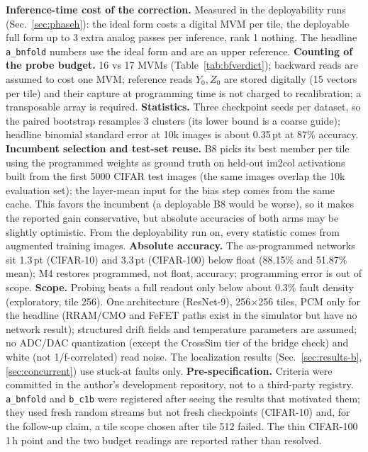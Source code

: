 \documentclass[journal]{IEEEtran}
\newcommand{\mfour}{\textsc{M4}}
\newcommand{\bviii}{\textsc{B8}}
\newcommand{\pt}{\,pt}
\begin{document}
\textbf{Inference-time cost of the correction.} Measured in the deployability runs (Sec.~\ref{sec:phaseh}): the ideal form costs a digital MVM per tile, the deployable full form up to 3 extra analog passes per inference, rank 1 nothing. The headline \texttt{a\_bnfold} numbers use the ideal form and are an upper reference.
\textbf{Counting of the probe budget.} 16 vs 17 MVMs (Table~\ref{tab:bfverdict}); backward reads are assumed to cost one MVM; reference reads $Y_0,Z_0$ are stored digitally (15 vectors per tile) and their capture at programming time is not charged to recalibration; a transposable array is required.
\textbf{Statistics.} Three checkpoint seeds per dataset, so the paired bootstrap resamples 3 clusters (its lower bound is a coarse guide); headline binomial standard error at 10k images is about 0.35\pt{} at 87\% accuracy.
\textbf{Incumbent selection and test-set reuse.} \bviii{} picks its best member per tile using the programmed weights as ground truth on held-out im2col activations built from the first 5000 CIFAR test images (the same images overlap the 10k evaluation set); the layer-mean input for the bias step comes from the same cache.
This favors the incumbent (a deployable \bviii{} would be worse), so it makes the reported gain conservative, but absolute accuracies of both arms may be slightly optimistic. From the deployability run on, every statistic comes from augmented training images.
\textbf{Absolute accuracy.} The as-programmed networks sit 1.3\pt{} (CIFAR-10) and 3.3\pt{} (CIFAR-100) below float (88.15\% and 51.87\% mean); \mfour{} restores programmed, not float, accuracy; programming error is out of scope.
\textbf{Scope.} Probing beats a full readout only below about 0.3\% fault density (exploratory, tile 256). One architecture (ResNet-9), 256$\times$256 tiles, PCM only for the headline (RRAM/CMO and FeFET paths exist in the simulator but have no network result); structured drift fields and temperature parameters are assumed; no ADC/DAC quantization (except the CrossSim tier of the bridge check) and white (not 1/f-correlated) read noise. The localization results (Sec.~\ref{sec:results-b}, \ref{sec:concurrent}) use stuck-at faults only.
\textbf{Pre-specification.} Criteria were committed in the author's development repository, not to a third-party registry. \texttt{a\_bnfold} and \texttt{b\_c1b} were registered after seeing the results that motivated them; they used fresh random streams but not fresh checkpoints (CIFAR-10) and, for the follow-up claim, a tile scope chosen after tile 512 failed.
The thin CIFAR-100 1\,h point and the two budget readings are reported rather than resolved.
\end{document}
